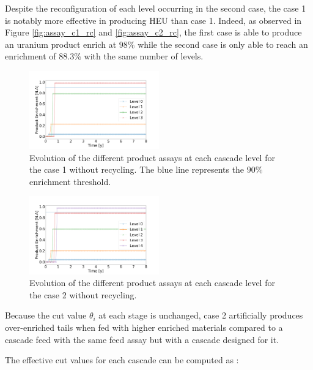 \documentclass{anstrans}
\begin{document}
Despite the reconfiguration of each level occurring in the second case, the case
1 is notably more effective in producing HEU than case 1. Indeed, as observed in
Figure \ref{fig:assay_c1_rc} and \ref{fig:assay_c2_rc}, the first case is able
to produce an uranium product enrich at $98\%$ while the second case is only
able to reach an enrichment of $88.3\%$ with the same number of levels.

\begin{figure}[ht] %
  \centering
  \includegraphics[width=0.5\textwidth]{assay_case_1_no_rec.png}
  \caption{Evolution of the different product assays at each cascade level for
  the case 1 without recycling. The blue line represents the $90\%$ enrichment
  threshold.}\label{fig:assay_c1_nr}
\end{figure}
\begin{figure}[ht] %
  \centering
  \includegraphics[width=0.5\textwidth]{assay_case_2_no_rec.png}
  \caption{Evolution of the different product assays at each cascade level for
  the case 2 without recycling. }\label{fig:assay_c2_nr}
\end{figure}

Because the cut value $\theta_i$ at each stage is unchanged, case 2 artificially
produces over-enriched tails when fed with higher enriched materials compared
to a cascade feed with the same feed assay but with a cascade designed for it.


The effective cut values for each cascade can be computed as :
\end{document}
